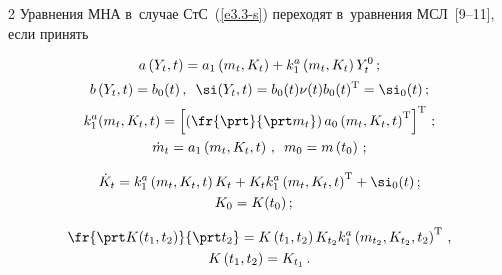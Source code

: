 \begin{multicols}{2}
Уравнения МНА в~случае СтС~(\ref{e3.3-s}) переходят в~уравнения МСЛ~[9--11], если принять

    \begin{gather}

    a\left(Y_t,t\right) = a_1 \left(m_t, K_t\right) + k_1^a \left(m_t, K_t\right) Y_t^0\,;\notag

   \\[1pt]

    b\left(Y_t,t\right) = b_0 (t)\,,\enskip \si(Y_t, t)= b_0(t) \nu(t) b_0(t)^{\mathrm{T}} = \si_0(t)\,;\notag   \\[1pt]

    k_1^a (m_t, K_t, t) =\left[ \left(\fr{\prt}{\prt m_t} \right)a_0 \left(m_t, K_t, t\right)^{\mathrm{T}}\right]^{\mathrm{T}}\,;\label{e3.11-s}

    \\

    \dot m_t = a_1 \left(m_t, K_t, t\right)\, ,\enskip m_0 = m\left(t_0\right)\,;\label{e3.12-s}

    \end{gather}



    \vspace*{-12pt}



    \noindent

    \begin{multline}

   \dot K_t = k_1^a \left(m_t, K_t, t\right) K_t + K_t k_1^a \left(m_t, K_t, t\right)^{\mathrm{T}} +\si_0(t)\,;\\

   \hspace*{-3mm}K_0 = K(t_0)\,;\label{e3.13-s}

   \end{multline}



\vspace*{-12pt}



    \noindent

    \begin{multline}

   \fr{\prt K(t_1, t_2)}{\prt t_2} = K\left(t_1, t_2\right) K_{t_2} k_1^a \left(m_{t_2}, K_{t_2}, t_2\right)^{\mathrm{T}}\,,\\

   K\left(t_1, t_2\right) = K_{t_1}\,.\label{e3.14-s}

   \end{multline}




\end{multicols}
